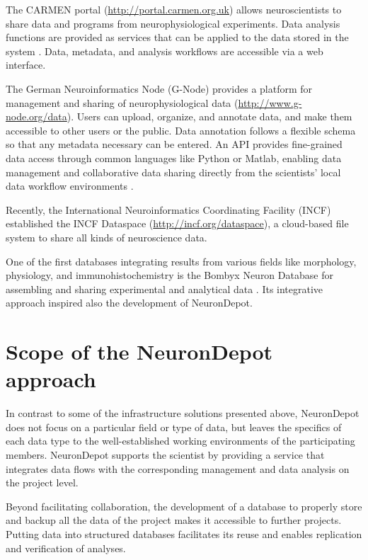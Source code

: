 \documentclass{frontiersSCNS} %
\begin{document}
The CARMEN portal (\url{http://portal.carmen.org.uk}) allows neuroscientists to
share data and programs from neurophysiological experiments. Data analysis
functions are provided as services that can be applied to the data stored in
the system \citep{austin_carmen:_2011}. Data, metadata, and analysis workflows are accessible via a web
interface.

The German Neuroinformatics Node (G-Node) provides a platform for management
and sharing of neurophysiological data (\url{http://www.g-node.org/data}).
Users can upload, organize, and annotate data, and make them accessible to
other users or the public. Data annotation follows a flexible schema \citep{Grewe2011} so that any metadata necessary can be entered. An API provides
fine-grained data access through common languages like Python or Matlab,
enabling data management and collaborative data sharing directly from the
scientists' local data workflow environments \citep{Sobolev2014a,Sobolev2014b}.

Recently, the International Neuroinformatics Coordinating Facility (INCF)
established the INCF Dataspace (\url{http://incf.org/dataspace}), a cloud-based
file system to share all kinds of neuroscience data.

One of the first databases integrating results from various fields like
morphology, physiology, and immunohistochemistry is the Bombyx Neuron Database
for assembling and sharing experimental and analytical data \citep{Kazawa2008}.
Its integrative approach inspired also the development of NeuronDepot.


\section{Scope of the NeuronDepot approach}

In contrast to some of the infrastructure solutions presented above,
NeuronDepot does not focus on a particular field or type of data, but leaves the
specifics of each data type to the well-established working environments of the
participating members. NeuronDepot supports the scientist by providing a
service that integrates data flows with the corresponding management and data
analysis on the project level.

Beyond facilitating collaboration, the development of a database to properly
store and backup all the data of the project makes it accessible to further
projects. Putting data into structured databases facilitates its reuse and
enables replication and verification of analyses.
\end{document}
